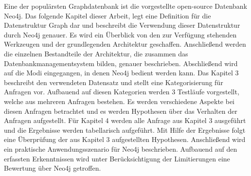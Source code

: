 Eine der populärsten Graphdatenbank ist die vorgestellte open-source Datenbank Neo4j\parencite{francis2018cypher}.  \newline 
Das folgende Kapitel dieser Arbeit, legt eine Definition für die Datenstruktur Graph dar und beschreibt die
Verwendung dieser Datenstruktur durch Neo4j genauer. Es wird
ein Überblick von den zur Verfügung stehenden Werkzeugen und der grundlegenden Architektur geschaffen. Anschließend werden die einzelnen Bestandteile der Architektur, die zusammen das Datenbankmanagementsystem bilden, genauer beschrieben. Abschließend wird auf die Modi eingegangen, in denen Neo4j bedient werden
kann. \newline
Das Kapitel 3 beschreibt den verwendeten Datensatz und stellt eine Kategorisierung
für Anfragen vor. Aufbauend auf diesen Kategorien werden 3 Testläufe vorgestellt, welche aus mehreren Anfragen bestehen. Es werden verschiedene Aspekte
bei diesen Anfragen betrachtet und es werden Hypothesen über das Verhalten der
Anfragen aufgestellt. \newline
Für Kapitel 4 werden alle Anfrage aus Kapitel 3 ausgeführt und die Ergebnisse werden tabellarisch aufgeführt. Mit Hilfe der Ergebnisse folgt eine Überprüfung der
aus Kapitel 3 aufgestellten Hypothesen. Anschließend wird ein praktische Anwendungsszenario für Neo4j beschrieben. Aufbauend auf den erfassten Erkenntnissen
wird unter Berücksichtigung der Limitierungen eine Bewertung über Neo4j getroffen.

